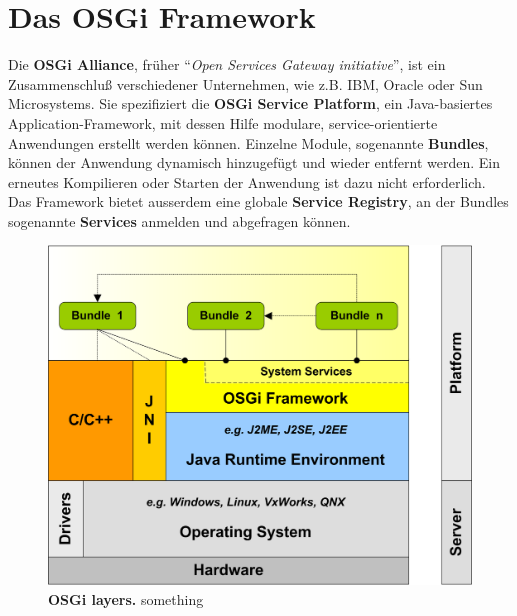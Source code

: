 \section{Das OSGi Framework}
Die \textbf{OSGi Alliance}, früher
\enquote{\textit{Open Services Gateway initiative}}, ist ein Zusammenschluß
verschiedener Unternehmen, wie z.B. IBM, Oracle oder Sun Microsystems.
Sie spezifiziert die \textbf{OSGi Service Platform}, ein Java-basiertes
Application-Framework, mit dessen Hilfe modulare, service-orientierte
Anwendungen erstellt werden können. Einzelne Module, sogenannte
\textbf{Bundles}, können der Anwendung dynamisch hinzugefügt und wieder
entfernt werden. Ein erneutes Kompilieren oder Starten der Anwendung ist dazu
nicht erforderlich.
Das Framework bietet ausserdem eine globale \textbf{Service Registry}, an der
Bundles sogenannte \textbf{Services} anmelden und abgefragen können.
\citep{wtherich_die_2008}

\begin{figure}[p]
	\begin{center}
		\includegraphics[scale=2]{pics/osgi_layer.png}
	\caption[OSGi layers]{
	\textbf{OSGi layers.}
	something}
	\end{center}
	\label{fig:osgi_layer}
\end{figure}

